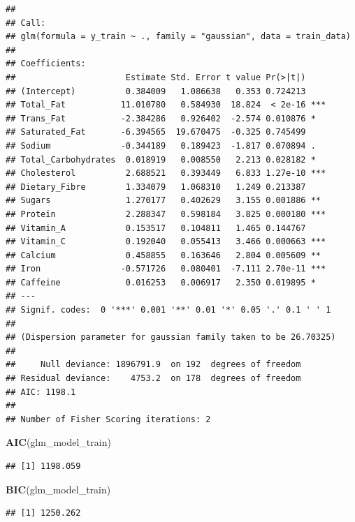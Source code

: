 \documentclass[
]{article}
\newenvironment{Shaded}{\begin{snugshade}}{\end{snugshade}}
\newcommand{\FunctionTok}[1]{\textcolor[rgb]{0.13,0.29,0.53}{\textbf{#1}}}
\newcommand{\NormalTok}[1]{#1}
\begin{document}
\begin{verbatim}
## 
## Call:
## glm(formula = y_train ~ ., family = "gaussian", data = train_data)
## 
## Coefficients:
##                      Estimate Std. Error t value Pr(>|t|)    
## (Intercept)          0.384009   1.086638   0.353 0.724213    
## Total_Fat           11.010780   0.584930  18.824  < 2e-16 ***
## Trans_Fat           -2.384286   0.926402  -2.574 0.010876 *  
## Saturated_Fat       -6.394565  19.670475  -0.325 0.745499    
## Sodium              -0.344189   0.189423  -1.817 0.070894 .  
## Total_Carbohydrates  0.018919   0.008550   2.213 0.028182 *  
## Cholesterol          2.688521   0.393449   6.833 1.27e-10 ***
## Dietary_Fibre        1.334079   1.068310   1.249 0.213387    
## Sugars               1.270177   0.402629   3.155 0.001886 ** 
## Protein              2.288347   0.598184   3.825 0.000180 ***
## Vitamin_A            0.153517   0.104811   1.465 0.144767    
## Vitamin_C            0.192040   0.055413   3.466 0.000663 ***
## Calcium              0.458855   0.163646   2.804 0.005609 ** 
## Iron                -0.571726   0.080401  -7.111 2.70e-11 ***
## Caffeine             0.016253   0.006917   2.350 0.019895 *  
## ---
## Signif. codes:  0 '***' 0.001 '**' 0.01 '*' 0.05 '.' 0.1 ' ' 1
## 
## (Dispersion parameter for gaussian family taken to be 26.70325)
## 
##     Null deviance: 1896791.9  on 192  degrees of freedom
## Residual deviance:    4753.2  on 178  degrees of freedom
## AIC: 1198.1
## 
## Number of Fisher Scoring iterations: 2
\end{verbatim}

\begin{Shaded}
\begin{Highlighting}[]
\FunctionTok{AIC}\NormalTok{(glm\_model\_train)}
\end{Highlighting}
\end{Shaded}

\begin{verbatim}
## [1] 1198.059
\end{verbatim}

\begin{Shaded}
\begin{Highlighting}[]
\FunctionTok{BIC}\NormalTok{(glm\_model\_train)}
\end{Highlighting}
\end{Shaded}

\begin{verbatim}
## [1] 1250.262
\end{verbatim}
\end{document}

